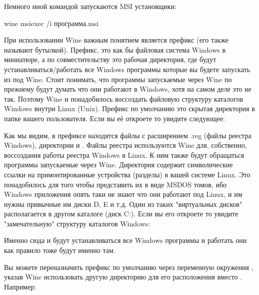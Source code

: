 \documentclass[letterpaper,10pt,russian,openany]{sphinxmanual}
\begin{document}
\sphinxAtStartPar
Немного иной командой запускаются MSI установщики:

\begin{sphinxVerbatim}[commandchars=\\\{\}]
wine msiexec /i программа.msi
\end{sphinxVerbatim}

\sphinxAtStartPar
При использовании Wine важным понятием является префикс (его также называют бутылкой).
Префикс, это как бы файловая система Windows в миниатюре, а по совместительству это рабочая директория,
где будут устанавливаться/работать все Windows программы которые вы будете запускать из под Wine.
Стоит понимать, что программы запускаемые через Wine по прежнему будут думать что они работают в Windows, хотя на самом деле это не так.
Поэтому Wine и понадобилось воссоздать файловую структуру каталогов Windows внутри Linux (Unix).
Префикс по умолчанию \sphinxhyphen{} это скрытая директория  в папке вашего пользователя.
Если вы её откроете то увидите следующее:

\noindent{}

\sphinxAtStartPar
Как мы видим, в префиксе находятся файлы с расширением .reg (файлы реестра Windows), директории  и .
Файлы реестра используются Wine для, собственно, воссоздания работы реестра Windows в Linux.
К ним также будут обращаться программы запускаемые через Wine.
Директория  содержит символические ссылки на примонтированные устройства (разделы) в вашей системе Linux.
Это понадобилось для того чтобы представить их в виде MS\sphinxhyphen{}DOS томов,
ибо Windows приложения опять таки не знают что они работают под Linux, и им нужны привычные им диски D, E и т.д.
Один из таких "виртуальных дисков" располагается в другом каталоге \sphinxhyphen{}  (диск C:).
Если вы его откроете то увидите "замечательную" структуру каталогов Windows:

\noindent{}

\sphinxAtStartPar
Именно сюда и будут устанавливаться все Windows программы и работать они как правило тоже будут именно там.

\sphinxAtStartPar
Вы можете переназначить префикс по умолчанию через переменную окружения ,
указав Wine использовать другую директорию для его расположения вместо . Например:
\end{document}
